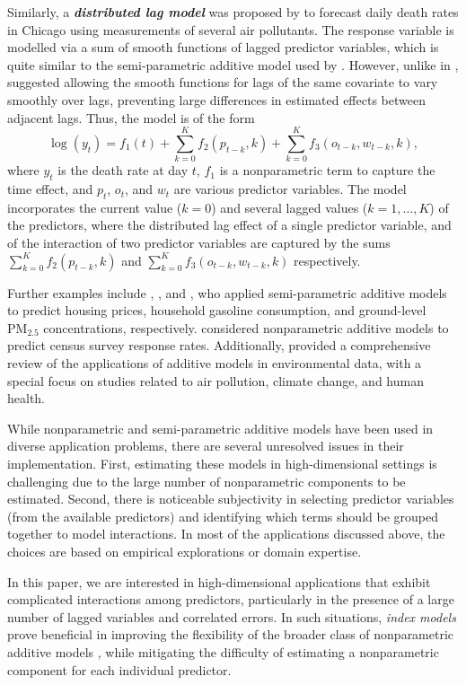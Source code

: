 \documentclass[
  11pt,
  a4paper,
]{article}
\begin{document}
Similarly, a \textbf{\emph{distributed lag model}} was proposed by
\textcite{Wood2017} to forecast daily death rates in Chicago using
measurements of several air pollutants. The response variable is
modelled via a sum of smooth functions of lagged predictor variables,
which is quite similar to the semi-parametric additive model used by
\textcite{FH2012}. However, unlike in \textcite{FH2012},
\textcite{Wood2017} suggested allowing the smooth functions for lags of
the same covariate to vary smoothly over lags, preventing large
differences in estimated effects between adjacent lags. Thus, the model
is of the form \[
 \log(y_{t}) = f_{1}(t) + \sum_{k=0}^{K} f_{2}(p_{t-k}, k) + \sum_{k=0}^{K} f_{3}(o_{t-k}, w_{t-k}, k),
\] where \(y_{t}\) is the death rate at day \(t\), \(f_{1}\) is a
nonparametric term to capture the time effect, and \(p_t\), \(o_t\), and
\(w_t\) are various predictor variables. The model incorporates the
current value (\(k = 0\)) and several lagged values
(\(k = 1, \dots, K\)) of the predictors, where the distributed lag
effect of a single predictor variable, and of the interaction of two
predictor variables are captured by the sums
\(\sum_{k=0}^{K} f_{2}(p_{t-k}, k)\) and
\(\sum_{k=0}^{K} f_{3}(o_{t-k}, w_{t-k}, k)\) respectively.

Further examples include \textcite{Boente2023}, \textcite{Du2012}, and
\textcite{Ho2020}, who applied semi-parametric additive models to
predict housing prices, household gasoline consumption, and ground-level
\(\text{PM}_{2.5}\) concentrations, respectively. \textcite{Ibrahim2023}
considered nonparametric additive models to predict census survey
response rates. Additionally, \textcite{Ravindra2019} provided a
comprehensive review of the applications of additive models in
environmental data, with a special focus on studies related to air
pollution, climate change, and human health.

While nonparametric and semi-parametric additive models have been used
in diverse application problems, there are several unresolved issues in
their implementation. First, estimating these models in high-dimensional
settings is challenging due to the large number of nonparametric
components to be estimated. Second, there is noticeable subjectivity in
selecting predictor variables (from the available predictors) and
identifying which terms should be grouped together to model
interactions. In most of the applications discussed above, the choices
are based on empirical explorations or domain expertise.

In this paper, we are interested in high-dimensional applications that
exhibit complicated interactions among predictors, particularly in the
presence of a large number of lagged variables and correlated errors. In
such situations, \emph{index models} prove beneficial in improving the
flexibility of the broader class of nonparametric additive models
\autocite{Radchenko2015}, while mitigating the difficulty of estimating
a nonparametric component for each individual predictor.
\end{document}
